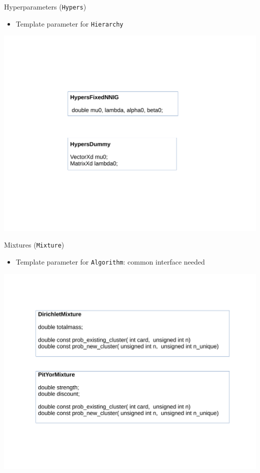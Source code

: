 \begin{frame}{Hyperparameters (\texttt{Hypers})}
\begin{itemize}
	\item Template parameter for \texttt{Hierarchy} 
\end{itemize}

\begin{center}
	\includegraphics[scale=0.35]{etc/hypers.pdf}
\end{center}
\end{frame}

\begin{frame}{Mixtures (\texttt{Mixture})}
\begin{itemize}
	\item Template parameter for \texttt{Algorithm}: common interface needed
\end{itemize}

\begin{center}
	\includegraphics[scale=0.35]{etc/mixture.pdf}
\end{center}

\end{frame}